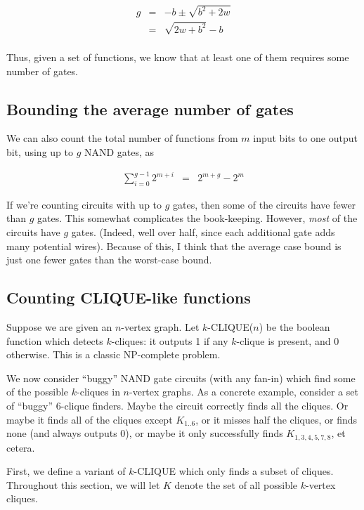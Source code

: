 \documentclass[12pt]{article}
\theoremstyle{definition}
\begin{document}
\begin{eqnarray*}
g & = & -b \pm \sqrt{ b^2 + 2w} \\
  & = & {\sqrt {2w + b^2}} - b \\
\end{eqnarray*}

Thus, given a set of functions, we know that at least one of them requires
some number of gates.

\subsection{Bounding the average number of gates}

We can also count the total number of functions from $m$ input bits to one
output bit, using up to $g$ NAND gates, as

\begin{eqnarray*}
\sum_{i=0}^{g-1} 2^{m+i} & = & 2^{m+g} - 2^m
\end{eqnarray*}

If we're counting circuits with up to $g$ gates, then some of the circuits
have fewer than $g$ gates. This somewhat complicates the book-keeping.
However, {\em most} of the
circuits have $g$ gates. (Indeed, well over half, since each additional
gate adds many potential wires). Because of this, I think that the
average case bound is just one fewer gates than the worst-case bound.

\subsection{Counting CLIQUE-like functions}

Suppose we are given an $n$-vertex graph.
Let $k$-CLIQUE($n$) be the boolean function which
detects $k$-cliques: it outputs 1 if any $k$-clique
is present, and 0 otherwise. This is a classic
NP-complete problem.

We now consider ``buggy'' NAND gate circuits (with any fan-in) which find some of the possible $k$-cliques in $n$-vertex
graphs.
As a concrete example,
consider a set of ``buggy'' 6-clique finders. 
Maybe the circuit correctly
finds all the cliques. Or maybe it finds all of the cliques except $K_{1..6}$,
or it misses half the cliques, or finds none (and always outputs 0), or maybe
it only successfully finds $K_{1,3,4,5,7,8}$, et cetera.

First, we define a variant of $k$-CLIQUE which only
finds a subset of cliques. Throughout this section,
we will let $K$ denote the set of all possible
$k$-vertex cliques.
\end{document}
